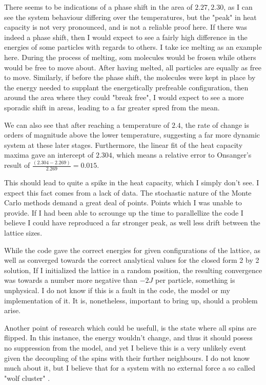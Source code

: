 \documentclass[10pt, twocolumn]{revtex4-1}
\begin{document}
There seems to be indications of a phase shift in the area of $2.27, 2.30$, as I can see the system behaviour differing over the temperatures, but the "peak"
in heat capacity is not very pronounced, and is not a reliable proof here. If there was indeed a phase shift, then I would expect to see a fairly high
difference in the energies of some particles with regards to others. I take ice melting as an example here. During the process of melting, som molecules
would be frosen while others would be free to move about. After having melted, all particles are equally as free to move. Similarly, if before the phase
shift, the molecules were kept in place by the energy needed to supplant the energetically prefreable configuration, then around the area where they could
"break free", I would expect to see a more sporadic shift in areas, leading to a far greater spred from the mean.

We can also see that after reaching a temperature of $2.4$, the rate of change is orders of magnitude above the lower temperature, suggesting a far more
dynamic system at these later stages. Furthermore, the linear fit of the heat capacity maxima gave an intercept of $2.304$, which means a relative error to
Onsanger's result of $\frac{(2.304 - 2.269)}{ 2.269 } = 0.015$.

This should lead to quite a spike in the heat capacity, which I
simply don't see. I expect this fact comes from a lack of data. The stochastic nature of the Monte Carlo methods demand a great deal of points. Points which I
was unable to provide. If I had been able to scrounge up the time to parallellize the code I believe I could have reproduced a far stronger peak, as well less
drift between the lattice sizes.

While the code gave the correct energies for given configurations of the lattice, as well as converged towards the correct analytical values for the closed
form 2 by 2 solution, If I initialized the lattice in a random position, the resulting convergence was towards a number more negative than $-2J$ per particle,
something is unphysical. I do not know if this is a fault in the code, the model or my implementation of it. It is, nonetheless, important to bring up, should
a problem arise.

Another point of research which could be usefull, is the state where all spins are flipped. In this instance, the energy wouldn't change, and thus it should
posess no suppression from the model, and yet I believe this is a very unlikely event given the decoupling of the spins with their further neighbours. I do
not know much about it, but I believe that for a system with no external force a so called "wolf cluster" \cite{WolfCluster}.
\end{document}
